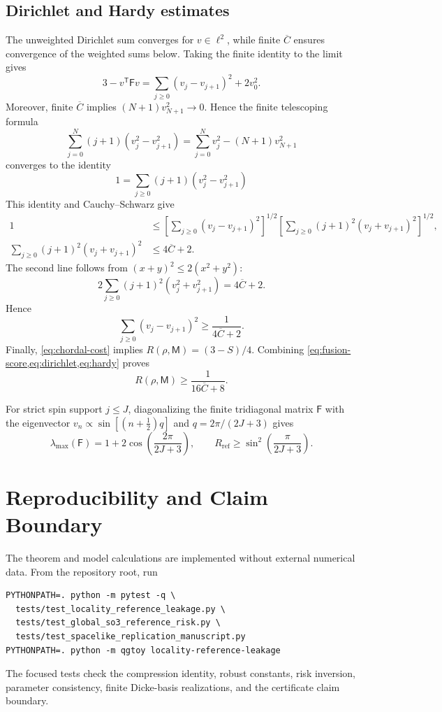 \documentclass[11pt]{article}
\theoremstyle{remark}
\newcommand{\1}{\mathbf 1}
\newcommand{\Rref}{R_{\mathrm{ref}}}
\begin{document}
\subsection*{Dirichlet and Hardy estimates}

The unweighted Dirichlet sum converges for $v\in\ell^2$, while finite
$\overline C$ ensures convergence of the weighted sums below. Taking the
finite identity to the limit gives
\begin{equation}
  3-v^{\mathsf T}\mathsf Fv
  =\sum_{j\geq0}(v_j-v_{j+1})^2+2v_0^2.
  \label{eq:dirichlet}
\end{equation}
Moreover, finite $\overline C$ implies
$(N+1)v_{N+1}^2\to0$. Hence the finite telescoping formula
\[
  \sum_{j=0}^{N}(j+1)(v_j^2-v_{j+1}^2)
  =\sum_{j=0}^{N}v_j^2-(N+1)v_{N+1}^2
\]
converges to the identity
\[
  1=\sum_{j\geq0}(j+1)(v_j^2-v_{j+1}^2)
\]
This identity and Cauchy--Schwarz give
\begin{align*}
  1
  &\leq
  \left[\sum_{j\geq0}(v_j-v_{j+1})^2\right]^{1/2}
  \left[\sum_{j\geq0}(j+1)^2(v_j+v_{j+1})^2\right]^{1/2},\\
  \sum_{j\geq0}(j+1)^2(v_j+v_{j+1})^2
  &\leq 4\overline C+2.
\end{align*}
The second line follows from $(x+y)^2\leq2(x^2+y^2)$:
\[
  2\sum_{j\geq0}(j+1)^2(v_j^2+v_{j+1}^2)
  =4\overline C+2.
\]
Hence
\begin{equation}
  \sum_{j\geq0}(v_j-v_{j+1})^2
  \geq\frac{1}{4\overline C+2}.
  \label{eq:hardy}
\end{equation}
Finally, \cref{eq:chordal-cost} implies
$R(\rho,\mathsf M)=(3-S)/4$. Combining
\cref{eq:fusion-score,eq:dirichlet,eq:hardy} proves
\[
  R(\rho,\mathsf M)\geq\frac{1}{16\overline C+8}.
\]

For strict spin support $j\leq J$, diagonalizing the finite tridiagonal matrix
$\mathsf F$ with the eigenvector
$v_n\propto\sin[(n+\tfrac12)q]$ and
$q=2\pi/(2J+3)$ gives
\[
  \lambda_{\max}(\mathsf F)=1+2\cos\!\left(\frac{2\pi}{2J+3}\right),
  \qquad
  \Rref\geq\sin^2\!\left(\frac{\pi}{2J+3}\right).
\]

\section{Reproducibility and Claim Boundary}
\label{app:reproducibility}

The theorem and model calculations are implemented without external numerical
data. From the repository root, run
\begin{verbatim}
PYTHONPATH=. python -m pytest -q \
  tests/test_locality_reference_leakage.py \
  tests/test_global_so3_reference_risk.py \
  tests/test_spacelike_replication_manuscript.py
PYTHONPATH=. python -m qgtoy locality-reference-leakage
\end{verbatim}
The focused tests check the compression identity, robust constants, risk
inversion, parameter consistency, finite Dicke-basis realizations, and the
certificate claim boundary.



\end{document}
